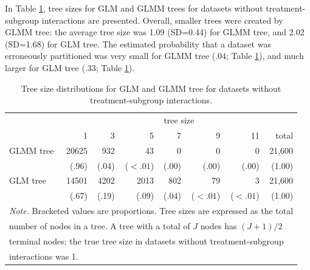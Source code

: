 \documentclass[nobf,doc]{apa}
\begin{document}
In Table \ref{tab:treesize_main}, tree sizes for GLM and GLMM trees for datasets without treatment-subgroup interactions are presented. Overall, smaller trees were created by GLMM tree: the average tree size was 1.09 (SD=0.44) for GLMM tree, and 2.02 (SD=1.68) for GLM tree. The estimated probability that a dataset was erroneously partitioned was very small for GLMM tree (.04; Table \ref{tab:treesize_main}), and much larger for GLM tree (.33; Table \ref{tab:treesize_main}). 

\begin{table}[!htbp]
\caption{Tree size distributions for GLM and GLMM tree for datasets without treatment-subgroup interactions.}
\small
\begin{tabular}{lrrrrrrr}
	\thickline
	&\multicolumn{7}{c}{tree size}\\
	\cline{2-7}
	&   1    &   3   &   5   &   7   &   9   &  11  &   total \\
	\hline
	GLMM tree	& 20625 & 932 & 43 &0&0&0& 21,600\\
		  		& (.96) & (.04) & ($<.01$) &(.00)&(.00)&(.00)&(1.00) \\
   	GLM tree		& 14501  & 4202 & 2013 & 802 & 79 & 3 & 21,600 \\ 
    			& (.67)  & (.19) & (.09) & (.04) & ($<.01$) & ($<.01$) & (1.00)\\ 
	\hline
  	\multicolumn{8}{l}{\textit{Note. }Bracketed values are proportions. Tree sizes are expressed as the total}\\
  	\multicolumn{8}{l}{number of nodes in a tree. A tree with a total of $J$ nodes has $(J+1)/2$ }\\
  	\multicolumn{8}{l}{terminal nodes; the true tree size in datasets without treatment-subgroup}\\	  	\multicolumn{8}{l}{interactions was 1.}\\
\end{tabular}
\label{tab:treesize_main}
\end{table}
\end{document}
